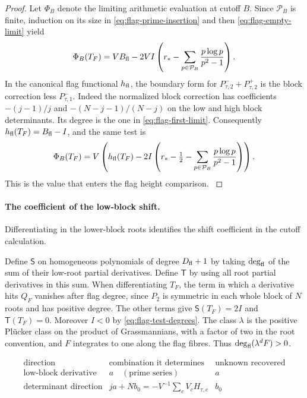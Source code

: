 \begin{proof}
Let \(\Phi_B\) denote the limiting arithmetic evaluation
at cutoff \(B\). Since \(\mathcal P_B\) is finite,
induction on its size in \eqref{eq:flag-prime-insertion}
and then \eqref{eq:flag-empty-limit} yield
\begin{equation}\label{eq:flag-arithmetic-test}
 \Phi_B(T_F)=VB_{\rm fl}
          -2VI\left(r_*-\sum_{p\in\mathcal P_B}
                              \frac{p\log p}{p^2-1}\right).
\end{equation}
In the canonical flag functional \(h_{\rm fl}\), the
boundary form for \(P_{\tau,2}^-+P_{\tau,2}^+\) is
the block correction less \(P_{\tau,1}^-\). Indeed
the normalized block correction has coefficients
\(-(j-1)/j\) and \(-(N-j-1)/(N-j)\) on the low and
high block determinants. Its degree is the one
in \eqref{eq:flag-first-limit}. Consequently
\(h_{\rm fl}(T_F)=B_{\rm fl}-I\), and the same
test is
\[
 \Phi_B(T_F)=V\left(h_{\rm fl}(T_F)
            -2I\left(r_*-\tfrac12
                      -\sum_{p\in\mathcal P_B}\frac{p\log p}{p^2-1}
                \right)\right).
\]
This is the value that enters the flag height
comparison. \label{cor:covolume-flag-test-15}

\end{proof}

\paragraph{The coefficient of the low-block shift.}

Differentiating in the lower-block roots identifies the shift coefficient in the cutoff calculation.

Define \(\mathsf S\) on homogeneous polynomials of degree
\(D_{\rm fl}+1\) by taking \(\deg_{\rm fl}\) of the sum
of their low-root partial derivatives. Define \(\mathsf T\)
by using all root partial derivatives in this sum.
When differentiating \(T_F\), the term in which a
derivative hits \(Q_F\) vanishes after flag degree,
since \(P_2\) is symmetric in each whole block of \(N\)
roots and has positive degree. The other terms give
\(\mathsf S(T_F)=2I\) and \(\mathsf T(T_F)=0\).
Moreover \(I<0\) by \eqref{eq:flag-test-degrees}.
The class \(\lambda\) is the positive Pl\"ucker class
on the product of Grassmannians, with a factor of two
in the root convention, and \(F\) integrates to one
along the flag fibres. Thus
\(\deg_{\rm fl}(\lambda^d F)>0\).

\begin{construction}
\[
\begin{array}{lll}
\text{direction}&\text{combination it determines}&\text{unknown recovered}\\ \hline
\text{low-block derivative}&a\quad(\text{prime series})&a\\
\text{determinant direction}&j a+N b_0=-V^{-1}\sum_c V_cH_{\tau,c}&b_0
\end{array}
\]
\caption{The low-block derivative includes the contribution from the good primes. Once the first shift is known, the determinant direction determines the trace shift.}\label{fig:flag-calibration-equations}
\end{construction}

